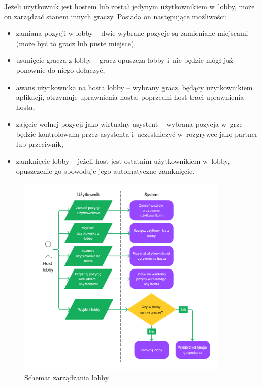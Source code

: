 Jeżeli użytkownik jest hostem lub został jedynym
użytkownikiem w~lobby, może on zarządzać stanem innych graczy.
Posiada on następujące możliwości:
\begin{itemize}
    \item zamiana pozycji w lobby -- dwie wybrane pozycje są zamieniane miejscami
          (może być to gracz lub puste miejsce),
    \item usunięcie gracza z lobby -- gracz opuszcza lobby i~nie będzie
          mógł już ponownie do niego dołączyć,
    \item awans użytkownika na hosta lobby -- wybrany gracz, będący użytkownikiem
          aplikacji, otrzymuje uprawnienia hosta; poprzedni host traci uprawnienia hosta,
    \item zajęcie wolnej pozycji jako wirtualny asystent -- wybrana pozycja
          w~grze będzie kontrolowana przez asystenta
          i~uczestniczyć w~rozgrywce jako partner lub przeciwnik,
    \item zamknięcie lobby -- jeżeli host jest ostatnim
          użytkownikiem w~lobby, opuszczenie go spowoduje jego automatyczne
          zamknięcie.

\end{itemize}

\begin{figure}[hbt!]
    \centering
    \includegraphics[width=0.9\textwidth]{img/schematy/manage_lobby.png}
    \caption{Schemat zarządzania lobby}
\end{figure}

